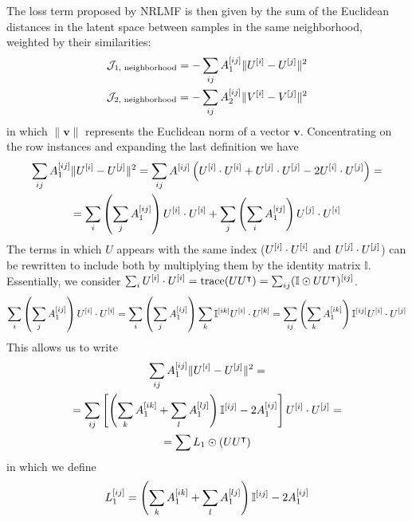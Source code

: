 \begin{apendicesenv}
The loss term proposed by NRLMF is then given by the sum of the Euclidean distances in the latent space between samples in the same neighborhood, weighted by their similarities:
%
\begin{gather}
    \mathcal{J}_\text{1, neighborhood} =
    - \sum_{ij}A_1^{[ij]} \|U^{[i]} - U^{[j]}\|^2
    \\
    \mathcal{J}_\text{2, neighborhood} =
    - \sum_{ij}A_2^{[ij]} \|V^{[i]} - V^{[j]}\|^2
    \label{eq:neighborhood_regularization}
\end{gather}
%
in which $\|\mathbf{v}\|$ represents the Euclidean norm of a vector $\mathbf{v}$.
Concentrating on the row instances and expanding the last definition we have
%
\begin{multline*}
    \sum_{ij}A_1^{[ij]} \|U^{[i]} - U^{[j]}\|^2
    = \sum_{ij} A^{[ij]}
    \left(
        U^{[i]}\cdot U^{[i]} + U^{[j]}\cdot U^{[j]} - 2 U^{[i]}\cdot U^{[j]}
    \right)
    =\\
    =
        \sum_i \left(\sum_j A_1^{[ij]}\right) U^{[i]}\cdot U^{[i]}
        + \sum_j \left(\sum_i A_1^{[ij]}\right) U^{[j]}\cdot U^{[i]}
\end{multline*}
%
The terms in which $U$ appears with the same index ($U^{[i]}\cdot U^{[i]}$ and $U^{[j]}\cdot U^{[j]}$) can be rewritten to include both by multiplying them by the identity matrix $\mathbb{I}$. Essentially, we consider $\sum_i U^{[i]}\cdot U^{[i]} = \text{trace}(U U^\intercal) = \sum_{ij} (\mathbb{I} \odot UU^\intercal)^{[ij]}$.
%
\begin{equation*}
    \sum_i \left(\sum_j A_1^{[ij]}\right) U^{[i]}\cdot U^{[i]}
    = \sum_i \left(\sum_j A_1^{[ij]}\right) \sum_k \mathbb{I}^{[ik]}U^{[i]}\cdot U^{[k]}
    = \sum_{ij} \left(\sum_k A_1^{[ik]}\right) \mathbb{I}^{[ij]} U^{[i]}\cdot U^{[j]}
\end{equation*}
%
This allows us to write
%
\begin{multline*}
    \sum_{ij}A_1^{[ij]} \|U^{[i]} - U^{[j]}\|^2
    =\\
    = \sum_{ij}
        \left[
            \left(\sum_k A_1^{[ik]} + \sum_l A_1^{[lj]}\right)
            \mathbb{I}^{[ij]}
            - 2 A_1^{[ij]} 
        \right]
        U^{[i]}\cdot U^{[j]}
    =\\
    = \sum L_1 \odot (UU^\intercal)
\end{multline*}
%
in which we define
%
\begin{equation}
    L_1\el{ij}
    = \left(\sum_k A_1\el{ik} + \sum_l A_1\el{lj}\right)
        \mathbb{I}\el{ij}
        - 2 A_1\el{ij} 

\end{equation}
\end{apendicesenv}
